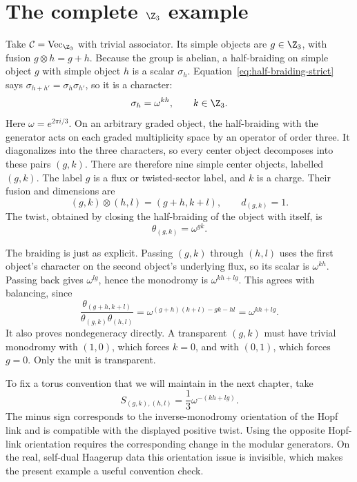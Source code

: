 \section{The complete \texorpdfstring{$\Z_3$}{Z3} example}

Take $\mathcal C=\operatorname{Vec}_{\Z_3}$ with trivial
associator.  Its simple objects are $g\in\Z_3$, with fusion
$g\otimes h=g+h$.  Because the group is abelian, a half-braiding
on simple object $g$ with simple object $h$ is a scalar
$\sigma_h$.  Equation~\eqref{eq:half-braiding-strict} says
$\sigma_{h+h'}=\sigma_h\sigma_{h'}$, so it is a character:
\[
 \sigma_h=\omega^{kh},\qquad k\in\Z_3.
\]
Here $\omega=e^{2\pi i/3}$. On an arbitrary graded object, the
half-braiding with the generator acts on each graded multiplicity
space by an operator of order three. It diagonalizes into the three
characters, so every center object decomposes into these pairs $(g,k)$.
There are therefore nine simple center objects, labelled $(g,k)$.
The label $g$ is a flux or twisted-sector label, and $k$ is a charge.
Their fusion and dimensions are
\begin{equation}
 (g,k)\otimes(h,l)=(g+h,k+l),\qquad d_{(g,k)}=1.
 \label{eq:Z3-center-fusion}
\end{equation}
The twist, obtained by closing the half-braiding of the object with
itself, is
\begin{equation}
 \theta_{(g,k)}=\omega^{gk}.
 \label{eq:Z3-center-twist}
\end{equation}

The braiding is just as explicit. Passing $(g,k)$ through $(h,l)$
uses the first object's character on the second object's underlying
flux, so its scalar is $\omega^{kh}$. Passing back gives
$\omega^{lg}$, hence the monodromy is $\omega^{kh+lg}$.
This agrees with balancing, since
\[
 \frac{\theta_{(g+h,k+l)}}{\theta_{(g,k)}\theta_{(h,l)}}
 =\omega^{(g+h)(k+l)-gk-hl}=\omega^{kh+lg}.
\]
It also proves nondegeneracy directly. A transparent $(g,k)$ must
have trivial monodromy with $(1,0)$, which forces $k=0$, and with
$(0,1)$, which forces $g=0$. Only the unit is transparent.

To fix a torus convention that we will maintain in the next chapter,
take
\begin{equation}
 S_{(g,k),(h,l)}=\frac13\omega^{-(kh+lg)}.
 \label{eq:Z3-center-S}
\end{equation}
The minus sign corresponds to the inverse-monodromy orientation of
the Hopf link and is compatible with the displayed positive twist.
Using the opposite Hopf-link orientation requires the corresponding
change in the modular generators.  On the real, self-dual Haagerup
data this orientation issue is invisible, which makes the present
example a useful convention check.

